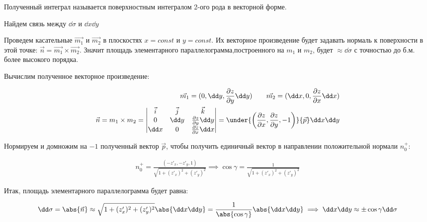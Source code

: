 Полученный интеграл называется поверхностным интегралом 2-ого рода в векторной
форме.

\begin{remark}
  Найдем связь между \(\dd \sigma\) и \(\dd x \dd y\)

  
\end{remark}

Проведем касательные \(\vec{m_{1}}\) и \(\vec{m_{2}}\) в плоскостях
\(x = const\) и \(y = const\). Их векторное произведение будет задавать нормаль
к поверхности в этой точке:
\(\vec{n} = \vec{m_{1}} \times \vec{m_{2}}\). Значит площадь
элементарного параллелограмма,построенного на \(m_{1}\) и \(m_{2}\), будет
\(\approx \dd \sigma\) с точностью до б.м. более высокого порядка.

Вычислим полученное векторное произведение:

\begin{align*}
  \vec{m_{1}} = (0, \dd y, \frac{\partial z}{\partial y} \dd y)
  \qquad
  \vec{m_{2}} = (\dd x, 0, \frac{\partial z}{\partial x} \dd x)
  \\
  \vec{n}
  = m_{1} \times m_{2}
  = \begin{vmatrix}
    \vec{i} & \vec{j} & \vec{k} \\
    0 & \dd y & \frac{\partial z}{\partial y} \dd y \\
    \dd x & 0 & \frac{\partial z}{\partial x} \dd x \\
  \end{vmatrix}
  =
  \under{\left(
    \frac{\partial z}{\partial x},
    \frac{\partial z}{\partial y},
    -1
  \right)}{\vec{p}} \dd x \dd y
\end{align*}

Нормируем и домножим на \(-1\) полученный вектор \(\vec{p}\), чтобы получить
единичный вектор  в направлении положительной нормали \(n_{0}^{+}\):

\begin{align*}
  n_{0}^{+}
  = \frac{(-z'_{x}, -z'_{y}, 1)}{\sqrt{1 + (z'_{x})^2 + (z'_{y})^2}}
  \implies \cos \gamma = \frac{1}{{\sqrt{1 + (z'_{x})^2 + (z'_{y})^2}}}
\end{align*}

Итак, площадь элементарного параллелограмма будет равна:

\begin{align*}
  \dd \sigma
  = \abs{\vec{n}}
  \approx \sqrt{1 + (z'_{x})^2 + (z'_{y})^2} \abs{\dd x \dd y}
  = \frac{1}{\abs{\cos \gamma}} \abs{\dd x \dd y}
  \implies \dd x \dd y \approx \pm \cos \gamma \dd \sigma
\end{align*}

